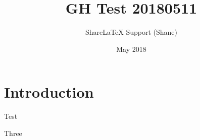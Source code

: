 \documentclass{article}
\title{GH Test 20180511}
\author{ShareLaTeX Support (Shane)}
\date{May 2018}
\begin{document}
\maketitle

\section{Introduction}

Test


Three
\end{document}
